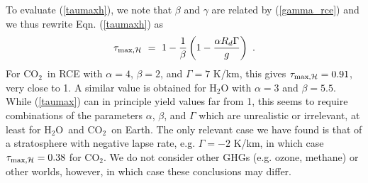\documentclass{ametsoc}
\newcommand{\beqn}{\begin{equation}}
\newcommand{\eeqn}{\end{equation}}
\newcommand{\eqnref}[1]{(\ref{#1})}
\newcommand{\Rd}{\ensuremath{R_d}}
\newcommand{\cotwo}{\ensuremath{\mathrm{CO_2}}}
\newcommand{\htwo}{\ensuremath{\mathrm{H_2O}}}
\newcommand{\ch}{\ensuremath{\mathcal{H}}}
\newcommand{\taumaxh}{\ensuremath{\tau_{\text{max,\ch}}}}
\begin{document}
To evaluate \eqnref{taumaxh}, we note that $\beta$ and $\gamma$ are related by \eqnref{gamma_rce} and we thus rewrite Eqn. \eqnref{taumaxh} as
\beqn
	\taumaxh \ = \ 1 - \frac{1}{\beta}\left(1-\frac{\alpha\Rd\Gamma}{g}\right) \ .
	\label{taumax}
\eeqn
 For \cotwo\ in RCE with $\alpha=4$, $\beta=2$, and $\Gamma=7$ K/km, this gives $\taumaxh = 0.91$, very close to 1. A similar value is obtained for $\htwo$ with $\alpha=3$ and $\beta=5.5$.  While \eqnref{taumax} can in principle yield values far from 1, this seems to require combinations of the parameters $\alpha$, $\beta$, and $\Gamma$ which are unrealistic or irrelevant, at least for \htwo\ and \cotwo\ on Earth. The only relevant case we have found is that of a stratosphere with negative lapse rate, e.g. $\Gamma=-2$ K/km, in which case $\taumaxh=0.38$ for \cotwo. We do not consider other GHGs (e.g. ozone, methane) or other worlds, however, in which case these conclusions  may differ. 
 




%
%
%
 
 
\end{document}
